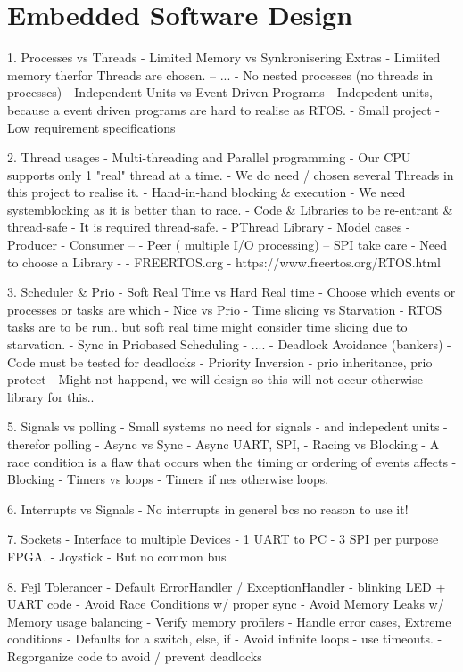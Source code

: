 \section{Embedded Software Design}
1. Processes vs Threads
- Limited Memory vs Synkronisering Extras
    - Limiited memory therfor Threads are chosen. -- ...
    - No nested processes (no threads in processes)
- Independent Units vs Event Driven Programs
    - Indepedent units, because a event driven programs are hard to realise as RTOS.
    - Small project
    - Low requirement specifications

2. Thread usages
- Multi-threading and Parallel programming
    - Our CPU supports only 1 "real" thread at a time.
    - We do need / chosen several Threads in this project to realise it.
- Hand-in-hand blocking \& execution
    - We need systemblocking as it is better than to race.
- Code \& Libraries to be re-entrant \& thread-safe
    - It is required thread-safe.
- PThread Library
  - Model cases
    - Producer - Consumer --
    - Peer ( multiple I/O processing) -- SPI take care
    - Need to choose a Library -
    - FREERTOS.org - https://www.freertos.org/RTOS.html

3. Scheduler \& Prio
- Soft Real Time vs Hard Real time
    - Choose which events or processes or tasks are which
    - Nice vs Prio
- Time slicing vs Starvation
    - RTOS tasks are to be run.. but soft real time might consider time slicing due to starvation.
- Sync in Priobased Scheduling
    - ....
- Deadlock Avoidance (bankers)
    - Code must be tested for deadlocks
- Priority Inversion - prio inheritance, prio protect
    - Might not happend, we will design so this will not occur otherwise library for this..

5. Signals vs polling
    - Small systems no need for signals - and indepedent units - therefor polling
- Async vs Sync
    - Async UART, SPI,
- Racing vs Blocking - A race condition is a flaw that occurs when the timing or ordering of events affects
    - Blocking
- Timers vs loops
    - Timers if nes otherwise loops.

6. Interrupts vs Signals
    - No interrupts in generel bcs no reason to use it!

7. Sockets
- Interface to multiple Devices
    - 1 UART to PC
    - 3 SPI per purpose FPGA.
    - Joystick
        - But no common bus

8. Fejl Tolerancer
- Default ErrorHandler / ExceptionHandler
    - blinking LED + UART code
- Avoid Race Conditions w/ proper sync
- Avoid Memory Leaks w/ Memory usage balancing - Verify memory profilers
- Handle error cases, Extreme conditions
    - Defaults for a switch, else, if
- Avoid infinite  loops - use timeouts.
- Regorganize code to avoid / prevent deadlocks

